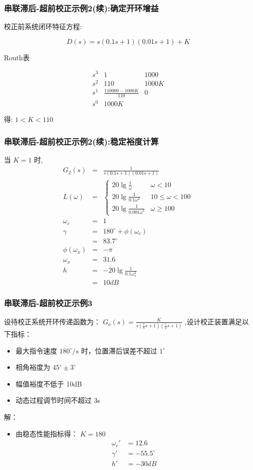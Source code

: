 \documentclass[table]{beamer}
\begin{document}
\begin{frame}
\frametitle{串联滞后-超前校正示例2(续):确定开环增益}
\label{sec-2-5}

校正前系统闭环特征方程:  

\[D(s)=s(0.1s+1)(0.01s+1)+K\]

Routh表

\[
\begin{matrix}
s^3  & 1 & 1000 \\
s^2  & 110 & 1000K \\
s^1  & \frac{110000-1000K}{110} & 0 \\
s^0  & 1000K 
\end{matrix}\]

得:  $1<K<110$ 
\end{frame}
\begin{frame}
\frametitle{串联滞后-超前校正示例2(续):稳定裕度计算}
\label{sec-2-6}

当  $K=1$  时, 
\begin{eqnarray*}
G_2(s) &=& \frac{1}{s(0.1s+1)(0.01s+1)} \\
L(\omega) & = & \begin{cases} 20\lg\frac{1}{\omega} & \omega<10 \\
                              20\lg\frac{1}{0.1\omega^2} & 10\leq \omega <100 \\
                              20\lg\frac{1}{0.001\omega^3} & \omega\geq 100  \end{cases}\\
\omega_c &=& 1 \\
\gamma &=& 180^{\circ}+\phi(\omega_c) \\
 &=& 83.7^{\circ} \\
\phi(\omega_x) &=& -\pi \\
\omega_x &=& 31.6\\
h &=& -20\lg\frac{1}{0.1\omega_x^2} \\
 &=& 10 dB
\end{eqnarray*}
\end{frame}
\begin{frame}
\frametitle{串联滞后-超前校正示例3}
\label{sec-2-7}

设待校正系统开环传递函数为： $G_o(s)=\frac{K}{s(\frac{1}{6}s+1)(\frac{1}{2}s+1)}$ ,设计校正装置满足以下指标：
\begin{itemize}
\item 最大指令速度 $180^{\circ}/s$ 时，位置滞后误差不超过 $1^{\circ}$
\item 相角裕度为 $45^{\circ}\pm 3^{\circ}$
\item 幅值裕度不低于 10dB
\item 动态过程调节时间不超过 3s
\end{itemize}

解：
\begin{itemize}
\item <2-> 由稳态性能指标得：  $K=180$
       \begin{align*}
        \omega_c' &=12.6 \\
        \gamma' &= -55.5^{\circ}\\
        h' &=-30dB
       \end{align*}
\end{itemize}
\end{frame}
\end{document}
